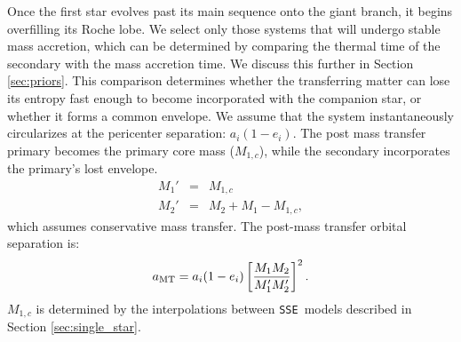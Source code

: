 \documentclass[12pt, preprint]{aastex}
\newcommand{\sse}{{\tt SSE}}
\begin{document}
Once the first star evolves past its main sequence onto the giant branch, it begins overfilling its Roche lobe. We select only those systems that will undergo stable mass accretion, which can be determined by comparing the thermal time of the secondary with the mass accretion time. We discuss this further in Section \ref{sec:priors}. This comparison determines whether the transferring matter can lose its entropy fast enough to become incorporated with the companion star, or whether it forms a common envelope. We assume that the system instantaneously circularizes at the pericenter separation: $a_i (1-e_i)$. The post mass transfer primary becomes the primary core mass ($M_{1,c}$), while the secondary incorporates the primary's lost envelope. 
\begin{eqnarray} 
M_1' &=& M_{1,c} \\
M_2' &=& M_2 + M_1 - M_{1,c},
\end{eqnarray}
which assumes conservative mass transfer. The post-mass transfer orbital separation is:
\begin{equation}
a_{\rm MT} = a_i (1-e_i) \left[ \frac{M_1 M_2}{M_1' M_2'} \right]^2.
\end{equation}
$M_{1,c}$ is determined by the interpolations between \sse\ models described in Section \ref{sec:single_star}.
\end{document}

